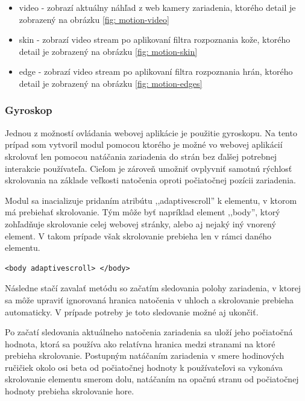 \begin{itemize}
  \item video - zobrazí aktuálny náhľad z web kamery zariadenia, ktorého detail je zobrazený na obrázku \ref{fig: motion-video}
  \item skin - zobrazí video stream po aplikovaní filtra rozpoznania kože, ktorého detail je zobrazený na obrázku \ref{fig: motion-skin}
  \item edge - zobrazí video stream po aplikovaní filtra rozpoznania hrán, ktorého detail je zobrazený na obrázku \ref{fig: motion-edges}
\end{itemize}




\subsubsection{Gyroskop} %
\label{ssub:gyroskop}

Jednou z možností ovládania webovej aplikácie je použitie gyroskopu. Na tento prípad som vytvoril modul pomocou ktorého je možné vo webovej aplikácií skrolovať len pomocou natáčania zariadenia do strán bez ďalšej potrebnej interakcie používateľa. Cieľom je zároveň umožniť ovplyvniť samotnú rýchlosť skrolovania na základe veľkosti natočenia oproti počiatočnej pozícii zariadenia.

Modul sa inacializuje pridaním atribútu ,,adaptivescroll'' k elementu, v ktorom má prebiehať skrolovanie. Tým môže byť napríklad element ,,body'', ktorý zohľadňuje skrolovanie celej webovej stránky, alebo aj nejaký iný vnorený element. V takom prípade však skrolovanie prebieha len v rámci daného elementu.

\begin{lstlisting}
<body adaptivescroll> </body>
\end{lstlisting}

Následne stačí zavalať metódu so začatím sledovania polohy zariadenia, v ktorej sa môže upraviť ignorovaná hranica natočenia v uhloch a skrolovanie prebieha automaticky. V prípade potreby je toto sledovanie možné aj ukončiť.

Po začatí sledovania aktuálneho natočenia zariadenia sa uloží jeho počiatočná hodnota, ktorá sa používa ako relatívna hranica medzi stranami na ktoré prebieha skrolovanie. Postupným natáčaním zariadenia v smere hodinových ručičiek okolo osi beta od počiatočnej hodnoty k používateľovi sa vykonáva skrolovanie elementu smerom dolu, natáčaním na opačnú stranu od počiatočnej hodnoty prebieha skrolovanie hore.

